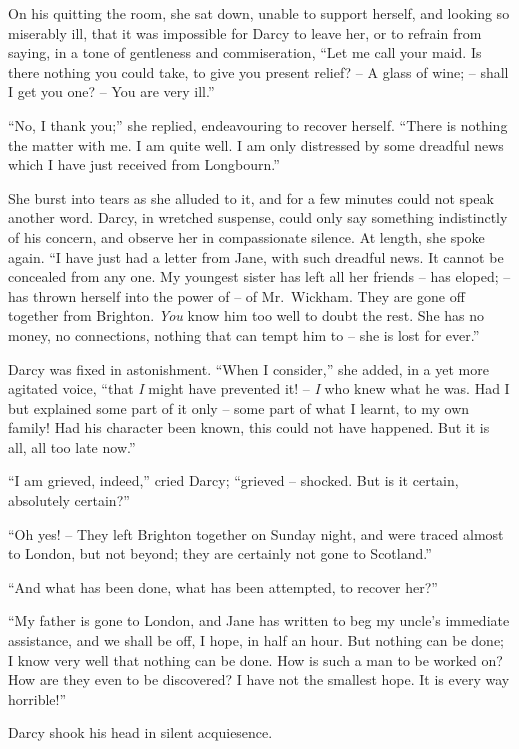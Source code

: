 On his quitting the room, she sat down, unable to
support herself, and looking so miserably ill, that it was
impossible for Darcy to leave her, or to refrain from
saying, in a tone of gentleness and commiseration, “Let
me call your maid. Is there nothing you could take, to
give you present relief? -- A glass of wine; -- shall I get
you one? -- You are very ill.”

“No, I thank you;” she replied, endeavouring to
recover herself. “There is nothing the matter with me.
I am quite well. I am only distressed by some dreadful
news which I have just received from Longbourn.”

She burst into tears as she alluded to it, and for a few
minutes could not speak another word. Darcy, in wretched
suspense, could only say something indistinctly of his
concern, and observe her in compassionate silence. At
length, she spoke again. “I have just had a letter from
Jane, with such dreadful news. It cannot be concealed
from any one. My youngest sister has left all her friends -- has
eloped; -- has thrown herself into the power of -- of
Mr.\ Wickham. They are gone off together from Brighton.
\textit{You} know him too well to doubt the rest. She has no
money, no connections, nothing that can tempt him to -- she
is lost for ever.”

Darcy was fixed in astonishment. “When I consider,”
she added, in a yet more agitated voice, “that \textit{I} might
have prevented it! -- \textit{I} who knew what he was. Had I but
explained some part of it only -- some part of what I learnt,
to my own family! Had his character been known, this
could not have happened. But it is all, all too late
now.”

“I am grieved, indeed,” cried Darcy; “grieved -- shocked.
But is it certain, absolutely certain?”

“Oh yes! -- They left Brighton together on Sunday
night, and were traced almost to London, but not beyond;
they are certainly not gone to Scotland.”

“And what has been done, what has been attempted,
to recover her?”

“My father is gone to London, and Jane has written
to beg my uncle’s immediate assistance, and we shall be
off, I hope, in half an hour. But nothing can be done;
I know very well that nothing can be done. How is such
a man to be worked on? How are they even to be discovered?
I have not the smallest hope. It is every way
horrible!”

Darcy shook his head in silent acquiesence.

